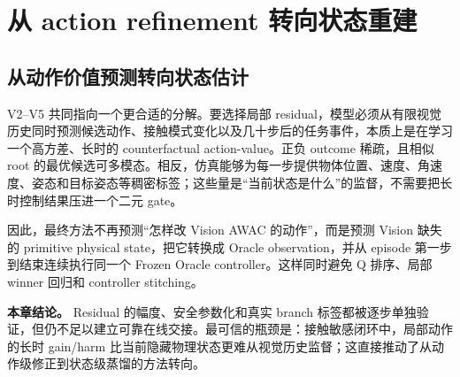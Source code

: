 \hypertarget{ux4ece-action-refinement-ux8f6cux5411ux72b6ux6001ux91cdux5efa}{%
\section{从 action refinement 转向状态重建}\label{ux4ece-action-refinement-ux8f6cux5411ux72b6ux6001ux91cdux5efa}}

\hypertarget{ux4eceux52a8ux4f5cux4ef7ux503cux9884ux6d4bux8f6cux5411ux72b6ux6001ux4f30ux8ba1}{%
\subsection{从动作价值预测转向状态估计}\label{ux4eceux52a8ux4f5cux4ef7ux503cux9884ux6d4bux8f6cux5411ux72b6ux6001ux4f30ux8ba1}}

V2--V5 共同指向一个更合适的分解。要选择局部 residual，模型必须从有限视觉历史同时预测候选动作、接触模式变化以及几十步后的任务事件，本质上是在学习一个高方差、长时的 counterfactual action-value。正负 outcome 稀疏，且相似 root 的最优候选可多模态。相反，仿真能够为每一步提供物体位置、速度、角速度、姿态和目标姿态等稠密标签；这些量是``当前状态是什么''的监督，不需要把长时控制结果压进一个二元 gate。

因此，最终方法不再预测``怎样改 Vision AWAC 的动作''，而是预测 Vision 缺失的 primitive physical state，把它转换成 Oracle observation，并从 episode 第一步到结束连续执行同一个 Frozen Oracle controller。这样同时避免 Q 排序、局部 winner 回归和 controller stitching。

\textbf{本章结论。} Residual 的幅度、安全参数化和真实 branch 标签都被逐步单独验证，但仍不足以建立可靠在线交接。最可信的瓶颈是：接触敏感闭环中，局部动作的长时 gain/harm 比当前隐藏物理状态更难从视觉历史监督；这直接推动了从动作级修正到状态级蒸馏的方法转向。
